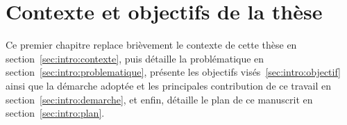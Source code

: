 \chapter{Contexte et objectifs de la thèse}
Ce premier chapitre replace brièvement le contexte de cette thèse en section~\ref{sec:intro:contexte}, puis détaille la problématique en section~\ref{sec:intro:problematique}, présente les objectifs visés~\ref{sec:intro:objectif} ainsi que la démarche adoptée et les principales contribution de ce travail en section~\ref{sec:intro:demarche}, et enfin, détaille le plan de ce manuscrit en section~\ref{sec:intro:plan}.






